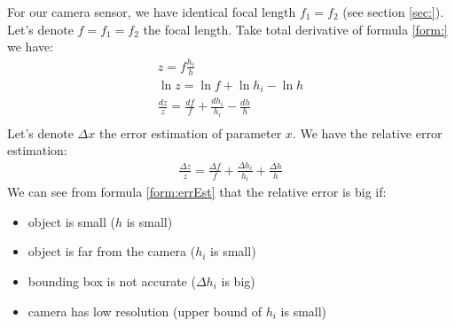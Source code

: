 For our camera sensor, we have identical focal length $f_1 = f_2$ (see section \ref{sec:}). Let's denote $f = f_1 = f_2$ the focal length. Take total derivative of formula \ref{form:} we have:
\begin{align*}
z = f \frac{h_i}{h} \\
\ln z = \ln f + \ln h_i - \ln h \\
\frac{d z}{z} = \frac{d f}{f} + \frac{d h_i}{h_i} - \frac{d h}{h} \\
\end{align*}
Let's denote $\Delta x$ the error estimation of parameter $x$. We have the relative error estimation:
\begin{align}
\frac{\Delta z}{z} =  \frac{\Delta f}{f} + \frac{\Delta h_i}{h_i} + \frac{\Delta h}{h}
\label{form:errEst}
\end{align}
We can see from formula \ref{form:errEst} that the relative error is big if: 
\begin{itemize}
	\item object is small ($h$ is small)
	\item object is far from the camera ($h_i$ is small)
	\item bounding box is not accurate ($\Delta h_i$ is big)
	\item camera has low resolution (upper bound of $h_i$ is small)
\end{itemize}
